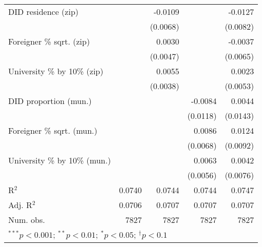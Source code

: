 \begin{tabular}{l D{.}{.}{4.11} D{.}{.}{4.7} D{.}{.}{4.11} D{.}{.}{4.7}}
DID residence (zip)               &                   & -0.0109       &                   & -0.0127       \\
                                  &                   & (0.0068)      &                   & (0.0082)      \\
Foreigner \% sqrt. (zip)          &                   & 0.0030        &                   & -0.0037       \\
                                  &                   & (0.0047)      &                   & (0.0065)      \\
University \% by 10\% (zip)       &                   & 0.0055        &                   & 0.0023        \\
                                  &                   & (0.0038)      &                   & (0.0053)      \\
DID proportion (mun.)             &                   &               & -0.0084           & 0.0044        \\
                                  &                   &               & (0.0118)          & (0.0143)      \\
Foreigner \% sqrt. (mun.)         &                   &               & 0.0086            & 0.0124        \\
                                  &                   &               & (0.0068)          & (0.0092)      \\
University \% by 10\% (mun.)      &                   &               & 0.0063            & 0.0042        \\
                                  &                   &               & (0.0056)          & (0.0076)      \\
\midrule
R$^2$                             & 0.0740            & 0.0744        & 0.0744            & 0.0747        \\
Adj. R$^2$                        & 0.0706            & 0.0707        & 0.0707            & 0.0707        \\
Num. obs.                         & 7827              & 7827          & 7827              & 7827          \\
\bottomrule
{}
\end{tabular}
